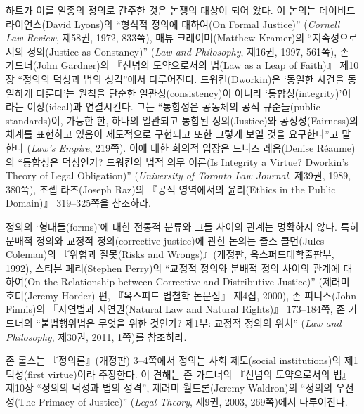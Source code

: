 { 하트가 이를 일종의 정의로 간주한 것은 논쟁의 대상이 되어 왔다.
이 논의는 데이비드 라이언스(David Lyons)의 ``형식적 정의에 대하여(On
Formal Justice)'' (\emph{Cornell Law Review}, 제58권, 1972, 833쪽), 매튜
크레이머(Matthew Kramer)의 ``지속성으로서의 정의(Justice as Constancy)''
(\emph{Law and Philosophy}, 제16권, 1997, 561쪽), 존 가드너(John
Gardner)의 『신념의 도약으로서의 법(Law as a Leap of Faith)』 제10장
``정의의 덕성과 법의 성격''에서 다루어진다. 드워킨(Dworkin)은 `동일한
사건을 동일하게 다룬다'는 원칙을 단순한 일관성(consistency)이 아니라
`통합성(integrity)'이라는 이상(ideal)과 연결시킨다. 그는 ``통합성은
공동체의 공적 규준들(public standards)이, 가능한 한, 하나의 일관되고
통합된 정의(Justice)와 공정성(Fairness)의 체계를 표현하고 있음이
제도적으로 구현되고 또한 그렇게 보일 것을 요구한다''고 말한다
(\emph{Law's Empire}, 219쪽). 이에 대한 회의적 입장은 드니즈 레옴(Denise
Réaume)의 ``통합성은 덕성인가? 드워킨의 법적 의무 이론(Is Integrity a
Virtue? Dworkin's Theory of Legal Obligation)'' (\emph{University of
Toronto Law Journal}, 제39권, 1989, 380쪽), 조셉 라즈(Joseph Raz)의
『공적 영역에서의 윤리(Ethics in the Public Domain)』 319--325쪽을
참조하라.

 정의의 `형태들(forms)'에 대한 전통적 분류와
그들 사이의 관계는 명확하지 않다. 특히 분배적 정의와 교정적
정의(corrective justice)에 관한 논의는 줄스 콜먼(Jules Coleman)의
『위험과 잘못(Risks and Wrongs)』(개정판, 옥스퍼드대학출판부, 1992),
스티븐 페리(Stephen Perry)의 ``교정적 정의와 분배적 정의 사이의 관계에
대하여(On the Relationship between Corrective and Distributive
Justice)'' (제러미 호더(Jeremy Horder) 편, 『옥스퍼드 법철학 논문집』
제4집, 2000), 존 피니스(John Finnis)의 『자연법과 자연권(Natural Law and
Natural Rights)』 173--184쪽, 존 가드너의 ``불법행위법은 무엇을 위한
것인가? 제1부: 교정적 정의의 위치'' (\emph{Law and Philosophy}, 제30권,
2011, 1쪽)를 참조하라.

 존 롤스는 『정의론』(개정판)
3--4쪽에서 정의는 사회 제도(social institutions)의 제1덕성(first
virtue)이라 주장한다. 이 견해는 존 가드너의 『신념의 도약으로서의 법』
제10장 ``정의의 덕성과 법의 성격'', 제러미 월드론(Jeremy Waldron)의
``정의의 우선성(The Primacy of Justice)'' (\emph{Legal Theory}, 제9권,
2003, 269쪽)에서 다루어진다.

}
